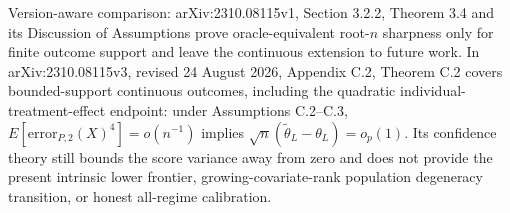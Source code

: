 Version-aware comparison: arXiv:2310.08115v1, Section 3.2.2, Theorem 3.4 and its Discussion of Assumptions prove oracle-equivalent root-\(n\) sharpness only for finite outcome support and leave the continuous extension to future work. In arXiv:2310.08115v3, revised 24 August 2026, Appendix C.2, Theorem C.2 covers bounded-support continuous outcomes, including the quadratic individual-treatment-effect endpoint: under Assumptions C.2--C.3, \(E[\mathrm{error}_{P,2}(X)^4]=o(n^{-1})\) implies \(\sqrt n(\widetilde\theta_L-\theta_L)=o_p(1)\). Its confidence theory still bounds the score variance away from zero and does not provide the present intrinsic lower frontier, growing-covariate-rank population degeneracy transition, or honest all-regime calibration.